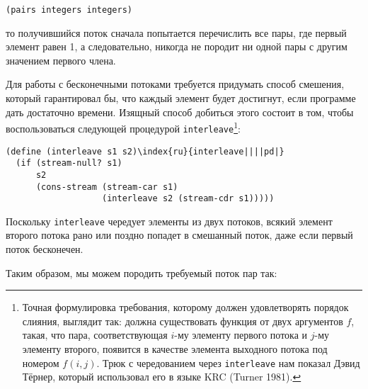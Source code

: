 \begin{Verbatim}[fontsize=\small]
(pairs integers integers)
\end{Verbatim}
то получившийся поток сначала попытается перечислить все пары, где первый
элемент равен 1, а следовательно, никогда не породит ни одной пары с
другим значением первого члена.

Для работы с бесконечными потоками требуется придумать
способ смешения, который гарантировал бы, что каждый элемент будет
достигнут, если программе дать достаточно времени.  Изящный
способ добиться этого состоит в том, чтобы воспользоваться следующей
процедурой {\tt interleave}\footnote{Точная формулировка требования, которому должен
удовлетворять порядок
слияния, выглядит так: должна существовать функция от двух аргументов
$f$, такая, что пара, соответствующая $i$-му
элементу первого потока и $j$-му элементу второго,
появится в качестве элемента выходного потока под номером
$f(i,j)$.  Трюк с чередованием через
{\tt interleave} нам показал Дэвид Тёрнер, который использовал
его в языке  KRC (Turner 1981).
}:

\begin{Verbatim}[fontsize=\small]
(define (interleave s1 s2)\index{ru}{interleave||||pd|}
  (if (stream-null? s1)
      s2
      (cons-stream (stream-car s1)
                   (interleave s2 (stream-cdr s1)))))
\end{Verbatim}
Поскольку {\tt interleave} чередует элементы из двух потоков,
всякий элемент второго потока рано или поздно попадет в смешанный
поток, даже если первый поток бесконечен.

Таким образом, мы можем породить требуемый поток пар так:

